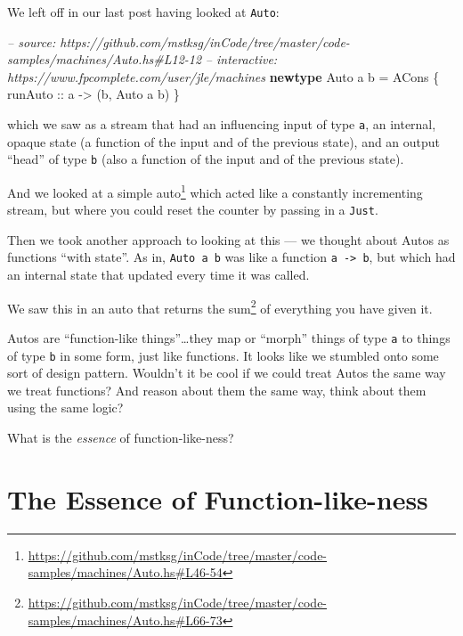 \documentclass[]{article}
\newenvironment{Shaded}{}{}
\newcommand{\KeywordTok}[1]{\textcolor[rgb]{0.00,0.44,0.13}{\textbf{{#1}}}}
\newcommand{\DataTypeTok}[1]{\textcolor[rgb]{0.56,0.13,0.00}{{#1}}}
\newcommand{\CommentTok}[1]{\textcolor[rgb]{0.38,0.63,0.69}{\textit{{#1}}}}
\newcommand{\OtherTok}[1]{\textcolor[rgb]{0.00,0.44,0.13}{{#1}}}
\newcommand{\FunctionTok}[1]{\textcolor[rgb]{0.02,0.16,0.49}{{#1}}}
\newcommand{\NormalTok}[1]{{#1}}
\renewcommand{\href}[2]{#2\footnote{\url{#1}}}
\begin{document}
We left off in our last post having looked at \texttt{Auto}:

\begin{Shaded}
\begin{Highlighting}[]
\CommentTok{-- source: https://github.com/mstksg/inCode/tree/master/code-samples/machines/Auto.hs#L12-12}
\CommentTok{-- interactive: https://www.fpcomplete.com/user/jle/machines}
\KeywordTok{newtype} \DataTypeTok{Auto} \NormalTok{a b }\FunctionTok{=} \DataTypeTok{ACons} \NormalTok{\{}\OtherTok{ runAuto ::} \NormalTok{a }\OtherTok{->} \NormalTok{(b, }\DataTypeTok{Auto} \NormalTok{a b) \}}
\end{Highlighting}
\end{Shaded}

which we saw as a stream that had an influencing input of type
\texttt{a}, an internal, opaque state (a function of the input and of
the previous state), and an output ``head'' of type \texttt{b} (also a
function of the input and of the previous state).

And we looked at
\href{https://github.com/mstksg/inCode/tree/master/code-samples/machines/Auto.hs\#L46-54}{a
simple auto} which acted like a constantly incrementing stream, but
where you could reset the counter by passing in a \texttt{Just}.

Then we took another approach to looking at this --- we thought about
Autos as functions ``with state''. As in, \texttt{Auto\ a\ b} was like a
function \texttt{a\ -\textgreater{}\ b}, but which had an internal state
that updated every time it was called.

We saw this in an auto that
\href{https://github.com/mstksg/inCode/tree/master/code-samples/machines/Auto.hs\#L66-73}{returns
the sum} of everything you have given it.

Autos are ``function-like things''\ldots{}they map or ``morph'' things
of type \texttt{a} to things of type \texttt{b} in some form, just like
functions. It looks like we stumbled onto some sort of design pattern.
Wouldn't it be cool if we could treat Autos the same way we treat
functions? And reason about them the same way, think about them using
the same logic?

What is the \emph{essence} of function-like-ness?

\section{The Essence of
Function-like-ness}\label{the-essence-of-function-like-ness}
\end{document}
